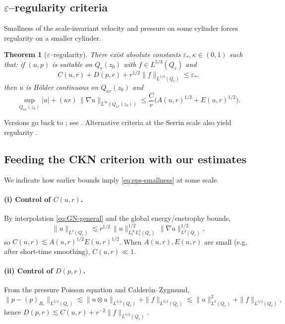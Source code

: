 \IfFileExists{nyjm.cls}{\documentclass[11pt]{nyjm}}{\documentclass[11pt]{amsart}}
\theoremstyle{plain}
\newtheorem{theorem}{Theorem}[section]
\theoremstyle{definition}
\theoremstyle{remark}
\begin{document}
\subsection{$\varepsilon$–regularity criteria}\label{subsec:eps-reg}
Smallness of the scale-invariant velocity and pressure on some cylinder forces regularity on a smaller cylinder.

\begin{theorem}[$\varepsilon$–regularity]\label{thm:eps-reg}
There exist absolute constants $\varepsilon_*,\kappa\in(0,1)$ such that: if $(u,p)$ is suitable on $Q_r(z_0)$ with $f\in L^{5/3}(Q_r)$ and
\begin{equation}\label{eq:eps-smallness}
C(u,r)+D(p,r)+ r^{1/2}\|f\|_{L^{5/3}(Q_r)} \le \varepsilon_*,
\end{equation}
then $u$ is H\"older continuous on $Q_{\kappa r}(z_0)$ and
\begin{equation}\label{eq:grad-bound}
\sup_{Q_{\kappa r}(z_0)} |u|
+ (\kappa r)\,\|\nabla u\|_{L^\infty(Q_{\kappa r}(z_0))}
\le \frac{C}{r}\Big(A(u,r)^{1/2}+E(u,r)^{1/2}\Big).
\end{equation}
\end{theorem}

Versions go back to \cite{CKN1982}; see \cite{Lin1998,LadyzhenskayaSereginSverak1999,Vasseur2007,SereginBook}. Alternative criteria at the Serrin scale also yield regularity \cite{Serrin1963,EscauriazaSereginSverak2003}.

\subsection{Feeding the CKN criterion with our estimates}\label{subsec:feed-ckn}
We indicate how earlier bounds imply \eqref{eq:eps-smallness} at some scale.

\paragraph{(i) Control of $C(u,r)$.}
By interpolation \eqref{eq:GN-general} and the global energy/enstrophy bounds,
\[
\|u\|_{L^3(Q_r)} \lesssim r^{1/2}\,\|u\|_{L^\infty_t L^2_x(Q_r)}^{1/2}\,\|\nabla u\|_{L^2(Q_r)}^{1/2},
\]
so $C(u,r)\lesssim A(u,r)^{1/2}E(u,r)^{1/2}$. When $A(u,r),E(u,r)$ are small (e.g. after short-time smoothing), $C(u,r)\ll1$.

\paragraph{(ii) Control of $D(p,r)$.}
From the pressure Poisson equation and Calder\'on–Zygmund,
\[
\|p-(p)_{B_r}\|_{L^{3/2}(Q_r)} \lesssim \|u\otimes u\|_{L^{3/2}(Q_r)} + \|f\|_{L^{3/2}(Q_r)}
\lesssim \|u\|_{L^3(Q_r)}^2+\|f\|_{L^{3/2}(Q_r)},
\]
hence $D(p,r)\lesssim C(u,r)+ r^{-2}\|f\|_{L^{3/2}(Q_r)}$.
\end{document}
